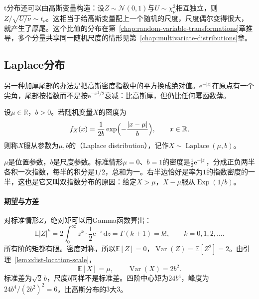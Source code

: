 t分布还可以由高斯变量构造：设$Z\sim\mathcal{N}(0,1)$与$U\sim\chi^{2}_{\nu}$相互独立，则$Z/\sqrt{U/\nu}\sim t_\nu$。这相当于给高斯变量配上一个随机的尺度，尺度偶尔变得很大，就产生了厚尾。这个比值的分布在第~\ref{chap:random-variable-transformations}章推导，多个分量共享同一随机尺度的情形见第~\ref{chap:multivariate-distributions}章。

\subsection{Laplace分布}
\label{sec:cdist-laplace}

另一种加厚尾部的办法是把高斯密度指数中的平方换成绝对值。$\mathrm{e}^{-\lvert x\rvert}$在原点有一个尖角，尾部按指数而不是按$\mathrm{e}^{-x^{2}/2}$衰减：比高斯厚，但仍比任何幂函数薄。

\begin{definition}[Laplace分布]
\label{def:cdist-laplace}
设$\mu\in\mathbb{R}$，$b>0$。若随机变量$X$的密度为
\begin{equation}
  f_X(x)=\frac{1}{2b}\exp\Bigl(-\frac{\lvert x-\mu\rvert}{b}\Bigr),\qquad x\in\mathbb{R},
  \label{eq:cdist-laplace-density}
\end{equation}
则称$X$服从参数为$\mu,b$的（Laplace distribution），记作$X\sim\operatorname{Laplace}(\mu,b)$。
\end{definition}

$\mu$是位置参数，$b$是尺度参数。标准情形$\mu=0$、$b=1$的密度是$\frac12\mathrm{e}^{-\lvert z\rvert}$，分成正负两半各积一次指数，每半的积分是$1/2$，总和为一。右半边恰好是率为$1$的指数密度的一半，这也是它又叫双指数分布的原因：给定$X>\mu$，$X-\mu$服从$\operatorname{Exp}(1/b)$。

\paragraph{期望与方差}
对标准情形$Z$，绝对矩可以用Gamma函数算出：
\[
  \mathbb{E}\lvert Z\rvert^{k}=2\int_0^{\infty}z^{k}\cdot\frac12\mathrm{e}^{-z}\,\mathrm{d}z=\Gamma(k+1)=k!,\qquad k=0,1,2,\dots .
\]
所有阶的矩都有限。密度对称，所以$\mathbb{E}[Z]=0$，$\operatorname{Var}(Z)=\mathbb{E}[Z^{2}]=2$。由引理~\ref{lem:cdist-location-scale}，
\begin{equation}
  \mathbb{E}[X]=\mu,\qquad \operatorname{Var}(X)=2b^{2}.
  \label{eq:cdist-laplace-moments}
\end{equation}
标准差为$\sqrt2\,b$，尺度$b$同样不是标准差。四阶中心矩为$24b^{4}$，峰度为$24b^{4}/(2b^{2})^{2}=6$，比高斯分布的$3$大$3$。

